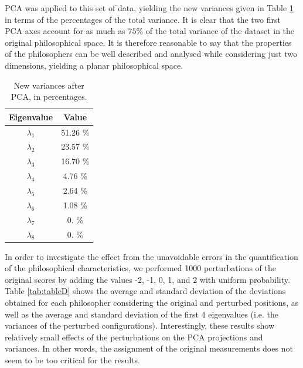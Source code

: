 \documentclass[%
 aip,
 jmp,%
 amsmath,amssymb,
 reprint,%
]{revtex4-1}
\begin{document}
PCA was applied to this set of data, yielding the new variances given
in Table \ref{tab:tableC} in terms of the percentages of the total
variance.  It is clear that the two first PCA axes account for as much
as $75\%$ of the total variance of the dataset in the original
philosophical space.  It is therefore reasonable to say that the
properties of the philosophers can be well described and analysed
while considering just two dimensions, yielding a planar philosophical
space.

\begin{table}%
\caption{\label{tab:tableC}New variances after PCA, in percentages.}

\begin{tabular}{|c||c|}
\hline
Eigenvalue & Value \\ \hline
$\lambda_1$ &  51.26 \% \\
$\lambda_2$ &  23.57 \% \\
$\lambda_3$ &  16.70 \% \\
$\lambda_4$ &  4.76 \% \\
$\lambda_5$ &  2.64 \% \\
$\lambda_6$ &  1.08 \% \\
$\lambda_7$ &    0. \%    \\
$\lambda_8$ &    0. \%    \\
\hline

\end{tabular}
\end{table}

In order to investigate the effect from the unavoidable errors in the
quantification of the philosophical characteristics, we performed 1000
perturbations of the original scores by adding the values -2, -1, 0,
1, and 2 with uniform probability.  Table \ref{tab:tableD} shows the
average and standard deviation of the deviations obtained for each
philosopher considering the original and perturbed positions, as well
as the average and standard deviation of the first 4 eigenvalues
(i.e. the variances of the perturbed configurations).  Interestingly,
these results show relatively small effects of the perturbations on
the PCA projections and variances.  In other words, the assignment of
the original measurements does not seem to be too critical for the
results.
\end{document}

